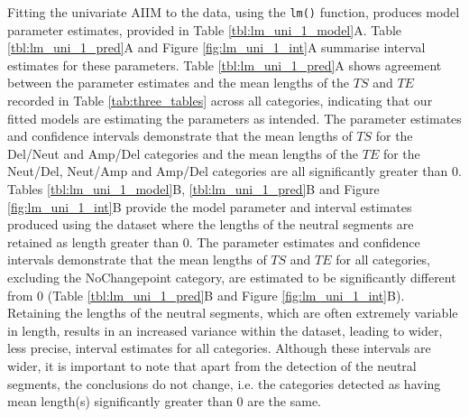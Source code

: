 Fitting the univariate AIIM to the data, using the \texttt{lm()} function, produces model parameter estimates, provided in Table \ref{tbl:lm_uni_1_model}A. Table \ref{tbl:lm_uni_1_pred}A and Figure \ref{fig:lm_uni_1_int}A summarise interval estimates for these parameters. Table \ref{tbl:lm_uni_1_pred}A shows agreement between the parameter estimates and the mean lengths of the $TS$ and $TE$ recorded in Table \ref{tab:three_tables} across all categories, indicating that our fitted models are estimating the parameters as intended. The parameter estimates and confidence intervals demonstrate that the mean lengths of $TS$ for the Del/Neut and Amp/Del categories and the mean lengths of the $TE$ for the Neut/Del, Neut/Amp and Amp/Del categories are all significantly greater than 0. Tables \ref{tbl:lm_uni_1_model}B, \ref{tbl:lm_uni_1_pred}B and Figure \ref{fig:lm_uni_1_int}B provide the model parameter and interval estimates produced using the dataset where the lengths of the neutral segments are retained as length greater than 0. The parameter estimates and confidence intervals demonstrate that the mean lengths of $TS$ and $TE$ for all categories, excluding the NoChangepoint category, are estimated to be significantly different from 0 (Table \ref{tbl:lm_uni_1_pred}B and Figure \ref{fig:lm_uni_1_int}B). Retaining the lengths of the neutral segments, which are often extremely variable in length, results in an increased variance within the dataset, leading to wider, less precise, interval estimates for all categories. Although these intervals are wider, it is important to note that apart from the detection of the neutral segments, the conclusions do not change, i.e. the categories detected as having mean length(s) significantly greater than 0 are the same. 

